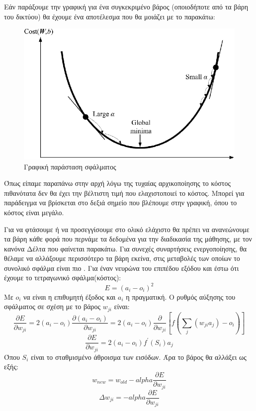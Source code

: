 Εάν παράξουμε την γραφική  για ένα συγκεκριμένο βάρος (οποιοδήποτε από
τα βάρη του δικτύου) θα έχουμε ένα αποτέλεσμα που θα μοιάζει με το παρακάτω:
\begin{figure}[H]
    \centering
    \includegraphics[width=1\textwidth]{images/weight-cost.png}
    \caption{Γραφική παράσταση σφάλματος}
\end{figure}

Όπως είπαμε παραπάνω στην αρχή λόγω της τυχαίας αρχικοποίησης το κόστος πιθανότατα
δεν θα έχει την βέλτιστη τιμή που ελαχιστοποιεί το κόστος. Μπορεί για παράδειγμα να
βρίσκεται στο δεξιά σημείο που βλέπουμε στην γραφική, όπου το κόστος είναι μεγάλο.

Για
να φτάσουμε ή να προσεγγίσουμε στο ολικό ελάχιστο θα πρέπει να ανανεώνουμε τα βάρη
κάθε φορά που περνάμε τα δεδομένα για την διαδικασία της μάθησης, με τον κανόνα Δέλτα
που φαίνεται παρακάτω. Για συνεχές συναρτήσεις ενεργοποίησης, θα θέλαμε να αλλάξουμε
περισσότερο τα βάρη εκείνα, στις μεταβολές των οποίων το συνολικό σφάλμα είναι πιο
. Για έναν νευρώνα του επιπέδου εξόδου και έστω ότι έχουμε το τετραγωνικό
σφάλμα(κόστος):
$$E=(a_i-o_i)^2$$
Με $o_i$ να είναι η επιθυμητή έξοδος και $a_i$ η πραγματική.
Ο ρυθμός αύξησης του σφάλματος σε σχέση με το βάρος $w_{ji}$ είναι:
$$\frac{\partial E}{\partial w_{ji}}=2(a_i-o_i)\frac{\partial (a_i-o_i)}{\partial w_{ji}}=2(a_i-o_i)\frac{\partial}{\partial w_{ji}}\left[ f\left( \sum\limits_j(w_{ji}a_j)-o_i\right)\right]$$
$$\frac{\partial E}{\partial w_{ji}}=2(a_i-o_i)f^\prime (S_i)a_j$$
Όπου $S_i$ είναι το σταθμισμένο άθροισμα των εισόδων.
Άρα το βάρος θα αλλάξει ως εξής:
$$w_{new}=w_{old}-alpha\frac{\partial E}{\partial w_{ji}}$$
$$\Delta w_{ji}=-alpha\frac{\partial E}{\partial w_{ji}}$$

